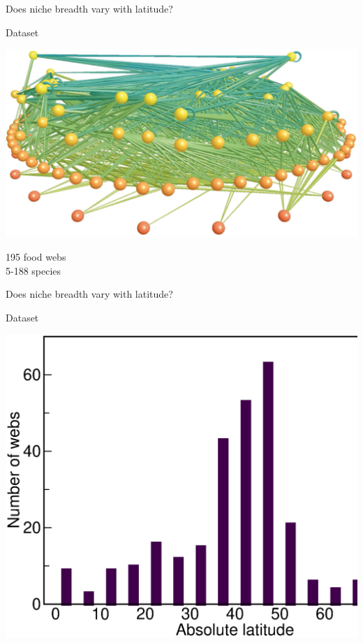 \documentclass{beamer}
\begin{document}
  \begin{frame}{Does niche breadth vary with latitude?}

    \begin{block}{Dataset}
    \begin{center}
      \includegraphics*[width=.75\textwidth]{Figures/LittleRockLake.eps}

      \vspace{.4cm}
    195 food webs \\
    5-188 species \\

    \end{center}
    \end{block}
  \end{frame}


  \begin{frame}{Does niche breadth vary with latitude?}

    \begin{block}{Dataset}
    \begin{center}
      \includegraphics*[width=.75\textwidth]{Figures/results/latitude_hist.eps}

    \end{center}
    \end{block}

  \end{frame}
\end{document}
